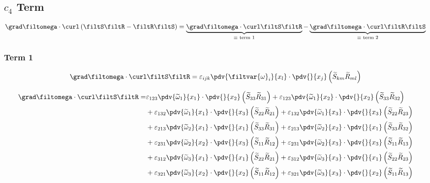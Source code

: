 \newpage
\subsection{$c_{4}$ Term}
\begin{equation}
    \grad \filtomega \cdot \curl \left(\filtS \filtR - \filtR \filtS \right) = 
        \underbrace{\grad \filtomega \cdot \curl \filtS \filtR}_{\equiv \text{ term 1}}
        -\underbrace{\grad \filtomega \cdot \curl \filtR \filtS}_{\equiv \text{ term 2}}
\end{equation}
\subsubsection{Term 1}
\begin{equation}
    \grad \filtomega \cdot \curl \filtS \filtR =
        \varepsilon_{ijk} \pdv{\filtvar{\omega}_{i}}{x_{l}} \cdot
        \pdv{}{x_{j}}\left(\widetilde{S}_{km} \widetilde{R}_{ml}\right)
\end{equation}

\begin{equation}
    \begin{split}
        \grad \filtomega \cdot \curl \filtS \filtR = &
                \varepsilon_{123}\pdv{\widetilde{\omega}_{1}}{x_{1}}\cdot\pdv{}{x_{2}}\left(\widetilde{S}_{33}\widetilde{R}_{31}\right)
                +\varepsilon_{123}\pdv{\widetilde{\omega}_{1}}{x_{2}}\cdot\pdv{}{x_{2}}\left(\widetilde{S}_{33}\widetilde{R}_{32}\right)    \\
        &       +\varepsilon_{132}\pdv{\widetilde{\omega}_{1}}{x_{1}}\cdot\pdv{}{x_{3}}\left(\widetilde{S}_{22}\widetilde{R}_{21}\right)
                +\varepsilon_{132}\pdv{\widetilde{\omega}_{1}}{x_{3}}\cdot\pdv{}{x_{3}}\left(\widetilde{S}_{22}\widetilde{R}_{23}\right)    \\
        &       +\varepsilon_{213}\pdv{\widetilde{\omega}_{2}}{x_{1}}\cdot\pdv{}{x_{1}}\left(\widetilde{S}_{33}\widetilde{R}_{31}\right)
                +\varepsilon_{213}\pdv{\widetilde{\omega}_{2}}{x_{2}}\cdot\pdv{}{x_{1}}\left(\widetilde{S}_{33}\widetilde{R}_{32}\right)    \\
        &       +\varepsilon_{231}\pdv{\widetilde{\omega}_{2}}{x_{2}}\cdot\pdv{}{x_{3}}\left(\widetilde{S}_{11}\widetilde{R}_{12}\right)
                +\varepsilon_{231}\pdv{\widetilde{\omega}_{2}}{x_{3}}\cdot\pdv{}{x_{3}}\left(\widetilde{S}_{11}\widetilde{R}_{13}\right)    \\
        &       +\varepsilon_{312}\pdv{\widetilde{\omega}_{3}}{x_{1}}\cdot\pdv{}{x_{1}}\left(\widetilde{S}_{22}\widetilde{R}_{21}\right)
                +\varepsilon_{312}\pdv{\widetilde{\omega}_{3}}{x_{3}}\cdot\pdv{}{x_{1}}\left(\widetilde{S}_{22}\widetilde{R}_{23}\right)    \\
        &       +\varepsilon_{321}\pdv{\widetilde{\omega}_{3}}{x_{2}}\cdot\pdv{}{x_{2}}\left(\widetilde{S}_{11}\widetilde{R}_{12}\right)
                +\varepsilon_{321}\pdv{\widetilde{\omega}_{3}}{x_{3}}\cdot\pdv{}{x_{2}}\left(\widetilde{S}_{11}\widetilde{R}_{13}\right)
    \end{split}
\end{equation}

